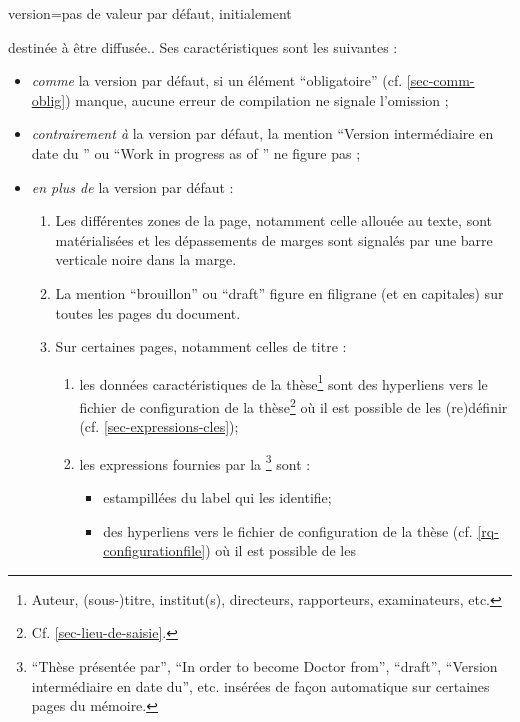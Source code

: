 {\begin{docKey}{version}{=\textbar{}\textbar{}\textbar{}\textbar{}\textbar{}}{pas
      de valeur par défaut, initialement }
\begin{description}
{        destinée à être diffusée.}. Ses caractéristiques sont les suivantes :
      \begin{itemize}
      \item \emph{comme} la version par défaut, si un élément
        \enquote{obligatoire} (cf. \vref{sec-comm-oblig}) manque, aucune erreur
        de compilation ne signale l'omission ;
      \item \emph{contrairement à} la version par défaut, la mention
        \enquote{Version intermédiaire en date du } ou
        \foreignquote{english}{Work in progress as of } ne
        figure pas ;
      \item \emph{en plus de} la version par défaut :
        \begin{enumerate}
        \item Les différentes zones de la page, notamment celle allouée au
          texte, sont matérialisées et les dépassements de marges sont signalés
          par une barre verticale noire dans la marge.
        \item La mention \enquote{brouillon} ou
          \foreignquote{english}{draft}\selonlangue{} figure en filigrane (et en
          capitales) sur toutes les pages du document.
        \item Sur certaines pages, notamment celles de titre :
          \begin{enumerate}
          \item les données caractéristiques de la thèse\footnote{Auteur,
              (sous-)titre, institut(s), directeurs, rapporteurs, examinateurs,
              etc.} sont des hyperliens vers le fichier de configuration de la
            thèse\footnote{Cf. \vref{sec-lieu-de-saisie}.} où il est possible de
            les (re)définir (cf. \vref{sec-expressions-cles});
          \item\label{item-expression} les expressions fournies par la
            \yatCl\footnote{\enquote{Thèse présentée par},
              \foreignquote{english}{In order to become Doctor from},
              \foreignquote{english}{draft}, \enquote{Version intermédiaire en
                date du}, etc. insérées de façon automatique sur certaines pages
              du mémoire.} sont :
            \begin{itemize}
            \item estampillées du label qui les identifie;
            \item des hyperliens vers le fichier de configuration de la thèse
              (cf.  \vref{rq-configurationfile}) où il est possible de les

\end{itemize}
\end{enumerate}
\end{enumerate}
\end{itemize}
\end{description}
\end{docKey}}
